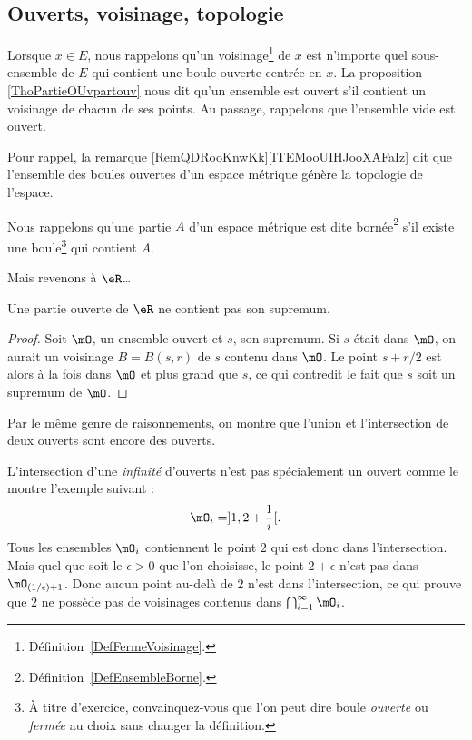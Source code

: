 \subsection{Ouverts, voisinage, topologie}

Lorsque $x\in E$, nous rappelons qu'un voisinage\footnote{Définition~\ref{DefFermeVoisinage}.} de $x$ est n'importe quel sous-ensemble de $E$ qui contient une boule ouverte centrée en $x$. La proposition \ref{ThoPartieOUvpartouv} nous dit qu'un ensemble est ouvert s'il contient un voisinage de chacun de ses points. Au passage, rappelons que l'ensemble vide est ouvert.

Pour rappel, la remarque \ref{RemQDRooKnwKk}\ref{ITEMooUIHJooXAFaIz} dit que l'ensemble des boules ouvertes d'un espace métrique génère la topologie de l'espace.

Nous rappelons qu'une partie $A$ d'un espace métrique est dite bornée\footnote{Définition~\ref{DefEnsembleBorne}.} s'il existe une boule\footnote{À titre d'exercice, convainquez-vous que l'on peut dire boule \emph{ouverte} ou \emph{fermée} au choix sans changer la définition.} qui contient $A$.

Mais revenons à \( \eR \)\dots
\begin{lemma}  \label{LemSupOuvPas}
    Une partie ouverte de \( \eR\) ne contient pas son supremum.
\end{lemma}

\begin{proof}
Soit $\mO$, un ensemble ouvert et $s$, son supremum. Si $s$ était dans $\mO$, on aurait un voisinage $B=B(s,r)$ de $s$ contenu dans $\mO$. Le point $s+r/2$ est alors à la fois dans $\mO$ et plus grand que $s$, ce qui contredit le fait que $s$ soit un supremum de $\mO$.
\end{proof}

Par le même genre de raisonnements, on montre que l'union et l'intersection de deux ouverts sont encore des ouverts.

\begin{remark}
L'intersection d'une \emph{infinité} d'ouverts n'est pas spécialement un ouvert comme le montre l'exemple suivant :
\[
  \mO_i=]1,2+\frac{ 1 }{ i }[.
\]
Tous les ensembles $\mO_i$ contiennent le point $2$ qui est donc dans l'intersection. Mais quel que soit le $\epsilon>0$ que l'on choisisse, le point $2+\epsilon$ n'est pas dans $\mO_{(1/\epsilon)+1}$. Donc aucun point au-delà de $2$ n'est dans l'intersection, ce qui prouve que $2$ ne possède pas de voisinages contenus dans $\bigcap_{i=1}^{\infty}\mO_i$.
\end{remark}

